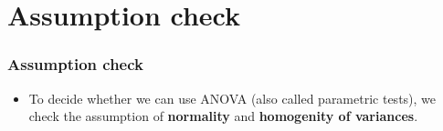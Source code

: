 \documentclass{beamer}
\begin{document}
%


\section{Assumption check} %

\begin{frame}
	\frametitle{Assumption check} 
	\begin{itemize}
		\item To decide whether we can use ANOVA (also called parametric tests), we check the assumption of \textbf{normality} and \textbf{homogenity of variances}.  %
	\end{itemize}
\end{frame}
\end{document}
